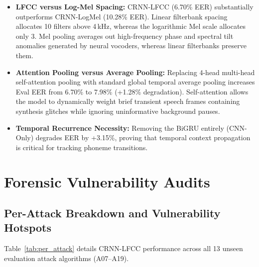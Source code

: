 \documentclass[conference]{IEEEtran}
\begin{document}
\begin{itemize}
    \item \textbf{LFCC versus Log-Mel Spacing:} CRNN-LFCC (6.70\% EER) substantially outperforms CRNN-LogMel (10.28\% EER). Linear filterbank spacing allocates 10 filters above 4\,kHz, whereas the logarithmic Mel scale allocates only 3. Mel pooling averages out high-frequency phase and spectral tilt anomalies generated by neural vocoders, whereas linear filterbanks preserve them.
    \item \textbf{Attention Pooling versus Average Pooling:} Replacing 4-head multi-head self-attention pooling with standard global temporal average pooling increases Eval EER from 6.70\% to 7.98\% (+1.28\% degradation). Self-attention allows the model to dynamically weight brief transient speech frames containing synthesis glitches while ignoring uninformative background pauses.
    \item \textbf{Temporal Recurrence Necessity:} Removing the BiGRU entirely (CNN-Only) degrades EER by +3.15\%, proving that temporal context propagation is critical for tracking phoneme transitions.
\end{itemize}

\section{Forensic Vulnerability Audits}

\subsection{Per-Attack Breakdown and Vulnerability Hotspots}
Table~\ref{tab:per_attack} details CRNN-LFCC performance across all 13 unseen evaluation attack algorithms (A07--A19).
\end{document}
